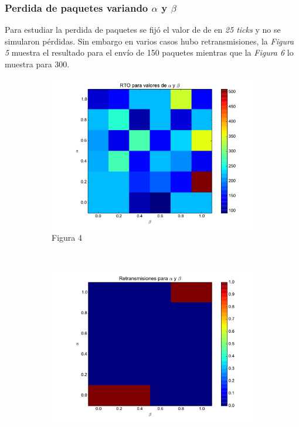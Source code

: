     \subsubsection{Perdida de paquetes variando $\alpha$ y $\beta$}
        Para estudiar la perdida de paquetes se fij\'o el valor de 
        de \rto{} en \textit{25 ticks} y no se simularon p\'erdidas.
        Sin embargo en varios casos hubo retransmisiones, la 
        \textit{Figura 5} muestra el resultado para el env\'io de 150
        paquetes mientras que la \textit{Figura 6} lo muestra para 300.
        
    \begin{figure}[H]
	    \center
	    \begin{subfigure}{0.32\textwidth}
		    \includegraphics[width=1.0\textwidth]{imagenes/rto_vs_alphaBeta.pdf}
		    \caption{Figura 4}
	    \end{subfigure}
	    ~
	    \begin{subfigure}{0.32\textwidth}
		    \includegraphics[width=1.0\textwidth]{imagenes/retransmisiones_150.pdf}

\end{subfigure}
\end{figure}
